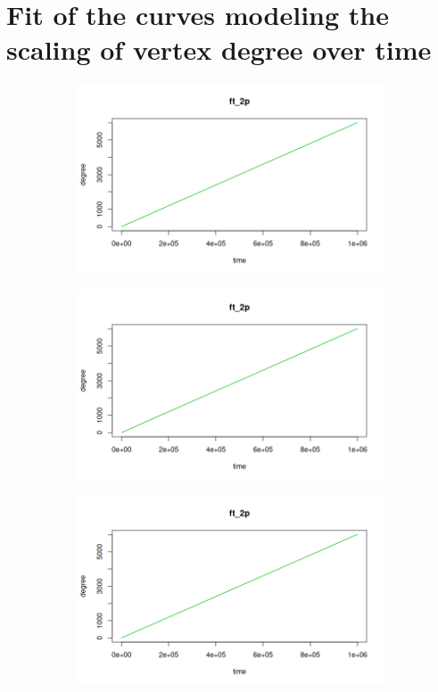 \newpage
\section{Fit of the curves modeling the scaling of vertex degree over time} \label{app:sca_fit}

\begin{figure}[ht]
\centering
\begin{subfigure}{.5\textwidth}
  \centering
  \includegraphics[width=\linewidth]{figures/scaling_fits/fit_ng_0.png}
\end{subfigure}%
\begin{subfigure}{.5\textwidth}
  \centering
  \includegraphics[width=\linewidth]{figures/scaling_fits/fit_ng_1.png}
\end{subfigure}
\begin{subfigure}{.5\textwidth}
  \centering
  \includegraphics[width=\linewidth]{figures/scaling_fits/fit_ng_2.png}

\end{subfigure}
\end{figure}
